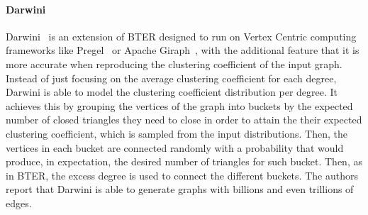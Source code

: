 \paragraph{Darwini} Darwini~\cite{edunov2016darwini} is an extension of BTER
designed to run on Vertex Centric computing frameworks like
Pregel~\cite{malewicz2010pregel} or Apache Giraph~\cite{ching2015one}, with the
additional feature that it is more accurate when reproducing the clustering
coefficient of the input graph. Instead of just focusing on the average
clustering coefficient for each degree, Darwini is able to model the clustering
coefficient distribution per degree. It achieves this by grouping the vertices
of the graph into buckets by the expected number of closed triangles they need
to close in order to attain the their expected clustering coefficient, which is
sampled from the input distributions. Then, the vertices in each bucket are
connected randomly with a probability that would produce, in expectation, the
desired number of triangles for such bucket. Then, as in BTER, the excess degree
is used to connect the different buckets. The authors report that Darwini is
able to generate graphs with billions and even trillions of edges.




